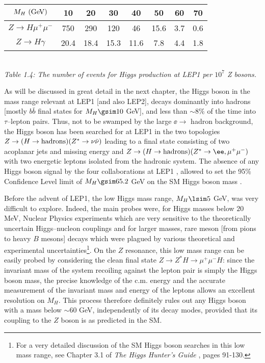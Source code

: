 \begin{table}[hbt]
\renewcommand{\arraystretch}{1.6} 
\begin{center} \begin{tabular}{|c||c|c|c|c|c|c|c|} \hline 
$ M_H~({\rm GeV})$   & 10 & 20 & 30 &  40 & 50 & 60& 70 \\ \hline 
$ Z \to H\mu^+ \mu^-$ & 750 & 290 & 120 & 46 & 15.6 & 3.7 & 0.6 \\  \hline 
$ Z \to H \gamma$  & 20.4 & 18.4 & 15.3 & 11.6 & 7.8 & 4.4 & 1.8 \\ \hline 
\end{tabular}\\[4mm] 
\renewcommand{\arraystretch}{1.2}
{\it Table 1.4: The number of events for Higgs production at LEP1 per $10^7$ 
Z bosons.}
\vspace*{-6mm}
\end{center}
\end{table}

As will be discussed in great detail in the next chapter, the Higgs boson in
the mass range relevant at LEP1 [and also LEP2], decays dominantly into hadrons
[mostly $b\bar{b}$ final states for $M_H \gsim 10$ GeV], and less than $\sim
8\%$ of the time into $\tau$--lepton pairs. Thus, not to be swamped by the
large $\ee \to$ hadron background, the Higgs boson has been searched for at
LEP1 in the two topologies $Z \to (H \to {\rm hadrons}) (Z^* \to \nu \bar \nu)$
leading to a final state consisting of two acoplanar jets and missing energy
and $Z \to  (H \to {\rm hadrons}) (Z^* \to \ee,\mu^+\mu^-)$ with two energetic
leptons isolated from the hadronic system. The absence of any Higgs boson
signal by the four collaborations at LEP1 \cite{LEP1-Higgs}, allowed to set the
95\% Confidence Level limit of $M_H \gsim  65.2$ GeV on the SM Higgs boson mass
\cite{LEP1-Higgs-average}. \s

Before the advent of LEP1, the low Higgs mass range, $ M_H \lsim 5$ GeV, was
very difficult to explore. Indeed, the main probes were, for Higgs masses below
$20$ MeV, Nuclear Physics experiments which are very sensitive to the
theoretically uncertain Higgs--nucleon couplings and for larger masses, rare
meson [from pions to heavy $B$ mesons] decays which were plagued by various
theoretical and experimental uncertainties\footnote{For a very detailed
discussion of the SM Higgs boson searches in this low mass range, see Chapter
3.1 of {\it The Higgs Hunter's Guide} \cite{HHG}, pages 91-130.}. On the $Z$
resonance, this low mass range can be easily probed by considering the clean
final state $Z\to Z^*H \to \mu^+ \mu^- H$: since the invariant mass of the
system recoiling against the lepton pair is simply the Higgs boson mass, the
precise knowledge of the c.m.  energy and the accurate measurement of the
invariant mass and energy of the leptons allows an excellent resolution on
$M_H$. This process therefore definitely rules out any Higgs boson with a mass
below $\sim 60$ GeV, independently of its decay modes, provided that its
coupling to the $Z$ boson is as predicted in the SM.  


